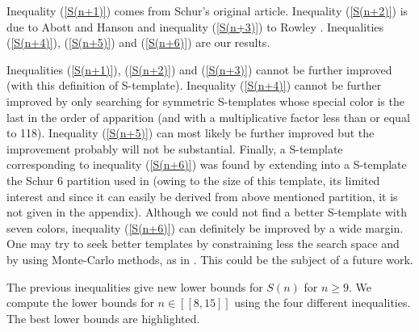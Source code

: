 Inequality (\ref{S(n+1)}) comes from  Schur's original article\cite{Schur1917}. Inequality (\ref{S(n+2)}) is due to
Abott and Hanson \cite{AbbottHanson} and inequality (\ref{S(n+3)}) to Rowley \cite{RowleyRamsey}. Inequalities 
(\ref{S(n+4)}), (\ref{S(n+5)}) and (\ref{S(n+6)}) are our results.

\par
Inequalities (\ref{S(n+1)}), (\ref{S(n+2)}) and (\ref{S(n+3)}) cannot be further improved (with this definition of S-template). 
Inequality (\ref{S(n+4)}) cannot be further improved by only searching for symmetric S-templates whose special color is the 
last in the order of apparition (and with a multiplicative factor less than or equal to 118). Inequality (\ref{S(n+5)}) can most 
likely be further improved but the improvement probably will not be substantial. Finally, a S-template corresponding to inequality 
(\ref{S(n+6)}) was found by extending into a S-template the Schur 6 partition used in \cite{rowley2021improved} (owing to the 
size of this template, its limited interest and since it can easily be derived from above mentioned partition, it is not given in 
the appendix). Although we could not find a better S-template with seven colors, inequality (\ref{S(n+6)}) can definitely be 
improved by a wide margin. One may try to seek better templates by constraining less the search space and by using Monte-Carlo 
methods, as in \cite{Bouzy2015AnAP}. This could be the subject of a future work.

\par
The previous inequalities give new lower bounds for \(S(n)\) for
\( n \geqslant 9 \). We compute the lower
bounds for \( n \in [\![8,15]\!] \) using the four different inequalities. The best lower bounds are highlighted.

\renewcommand{\arraystretch}{0.2}

